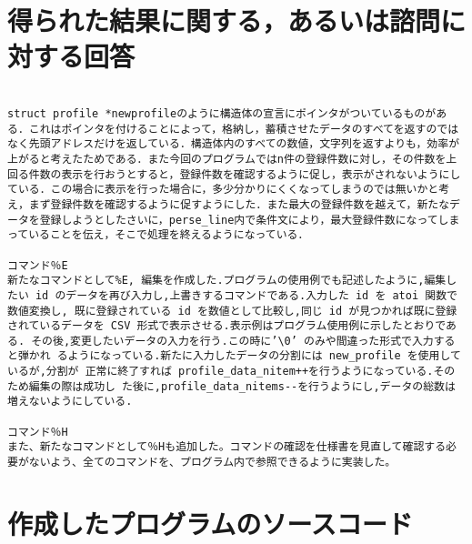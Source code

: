 \documentclass[a4j]{jarticle}
\begin{document}
%
%

\section{得られた結果に関する，あるいは諮問に対する回答}

\begin{verbatim}

struct profile *newprofileのように構造体の宣言にポインタがついているものがある．これはポインタを付けることによって，格納し，蓄積させたデータのすべてを返すのではなく先頭アドレスだけを返している．構造体内のすべての数値，文字列を返すよりも，効率が上がると考えたためである．また今回のプログラムではn件の登録件数に対し，その件数を上回る件数の表示を行おうとすると，登録件数を確認するように促し，表示がされないようにしている．この場合に表示を行った場合に，多少分かりにくくなってしまうのでは無いかと考え，まず登録件数を確認するように促すようにした．また最大の登録件数を越えて，新たなデータを登録しようとしたさいに，perse_line内で条件文により，最大登録件数になってしまっていることを伝え，そこで処理を終えるようになっている．

コマンド％E
新たなコマンドとして%E, 編集を作成した.プログラムの使用例でも記述したように,編集したい id のデータを再び入力し,上書きするコマンドである.入力した id を atoi 関数で数値変換し, 既に登録されている id を数値として比較し,同じ id が見つかれば既に登録されているデータを CSV 形式で表示させる.表示例はプログラム使用例に示したとおりである. その後,変更したいデータの入力を行う.この時に’\0’ のみや間違った形式で入力すると弾かれ るようになっている.新たに入力したデータの分割には new_profile を使用しているが,分割が 正常に終了すれば profile_data_nitem++を行うようになっている.そのため編集の際は成功し た後に,profile_data_nitems--を行うようにし,データの総数は増えないようにしている.

コマンド％H
また、新たなコマンドとして％Hも追加した。コマンドの確認を仕様書を見直して確認する必要がないよう、全てのコマンドを、プログラム内で参照できるように実装した。

\end{verbatim}

\newpage

%
%

\section{作成したプログラムのソースコード}




\end{document}
